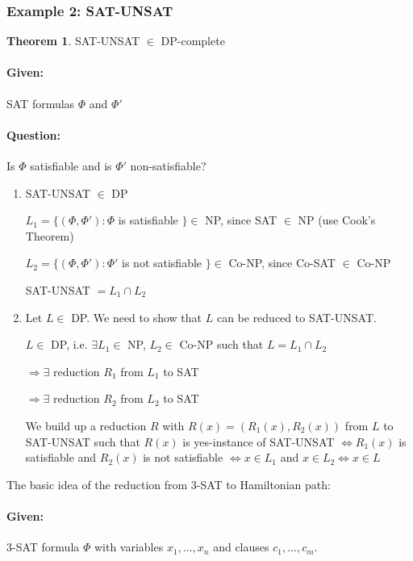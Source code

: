 \documentclass[11pt]{article}
\theoremstyle{definition}
\newtheorem{theorem}{Theorem}[section]
\theoremstyle{definition}
\begin{document}
\subsubsection{Example 2: SAT-UNSAT}

\begin{theorem}
SAT-UNSAT $ \in $ DP-complete
\end{theorem}

\paragraph{Given:} SAT formulas $ \Phi $ and $ \Phi' $
\paragraph{Question:} Is $ \Phi $ satisfiable and is $ \Phi' $ non-satisfiable?

\begin{enumerate}
\item SAT-UNSAT $ \in $ DP

	$ L_1 = \{ (\Phi, \Phi') : \Phi $ is satisfiable $ \} \in $ NP, since SAT $ \in $ NP (use Cook's Theorem)
	
	$ L_2 = \{ (\Phi, \Phi') : \Phi' $ is not satisfiable $ \} \in $ Co-NP, since Co-SAT $ \in $ Co-NP
	
	SAT-UNSAT $ = L_1 \cap L_2 $
\item Let $ L \in $ DP. We need to show that $ L $ can be reduced to SAT-UNSAT.

$ L \in $ DP, i.e. $ \exists L_1 \in $ NP, $ L_2 \in $ Co-NP such that $ L = L_1 \cap L_2 $

$ \Rightarrow \exists $ reduction $ R_1 $ from $ L_1 $ to SAT

$ \Rightarrow \exists $ reduction $ R_2 $ from $ L_2 $ to SAT

We build up a reduction $ R $ with $ R (x) = (R_1(x), R_2(x)) $ from $ L $ to SAT-UNSAT such that $ R(x) $ is yes-instance of SAT-UNSAT $ \Leftrightarrow R_1(x) $ is satisfiable and $ R_2(x) $ is not satisfiable $ \Leftrightarrow x \in L_1 $ and $ x \in L_2 \Leftrightarrow x \in L $
\end{enumerate}

The basic idea of the reduction from 3-SAT to Hamiltonian path:
\paragraph{Given:} 3-SAT formula $ \Phi $ with variables $ x_1, \dots, x_n $ and clauses $ c_1, \dots, c_m $.
\end{document}
